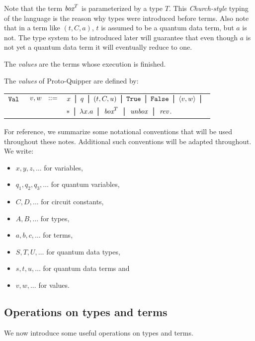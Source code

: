 \documentclass[twoside]{article}
\begin{document}
Note that the term $\mathop{\textit{box}}\nolimits^T$ is parameterized by a type $T$. This
\emph{Church-style} typing of the language is the reason why types
were introduced before terms. Also note that in a term like $(t,C,a)$,
$t$ is assumed to be a quantum data term, but $a$ is not. The type
system to be introduced later will guarantee that even though $a$ is
not yet a quantum data term it will eventually reduce to one.

The \emph{values} are the terms whose execution is finished.

\begin{definition}
The \emph{values} of Proto-Quipper are defined by:
\begin{center}
\begin{tabular}{rrl}
$\texttt{Val}$&$~v,w~~::=$ & $x \bor q \bor (t,C,u) \bor \true \bor 
  \false \bor \p{v,w} \bor$ \\
& & $* \bor \lambda x.a  \bor \boxx^T \bor \unbox \bor \rev.$
\end{tabular}
\end{center}
\end{definition}

\noindent
For reference, we summarize some notational conventions that will be
used throughout these notes. Additional such conventions will be
adapted throughout. We write:
\begin{itemize}
  \item $x,y,z,\ldots$ for variables,
  \item $q_1,q_2,q_3,\ldots$ for quantum variables,
  \item $C,D,\ldots$ for circuit constants,
  \item $A,B,\ldots$ for types,
  \item $a,b,c,\ldots$ for terms,
  \item $S,T,U,\ldots$ for quantum data types,
  \item $s,t,u,\ldots$ for quantum data terms and
  \item $v,w,\ldots$ for values.
\end{itemize}

\subsection{Operations on types and terms}

We now introduce some useful operations on types and terms. 
\end{document}
